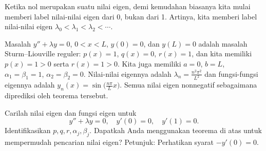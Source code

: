 Ketika nol
merupakan suatu nilai eigen, demi kemudahan biasanya kita
mulai memberi label nilai-nilai eigen dari 0, bukan dari 1.
Artinya, kita memberi label nilai-nilai eigen $\lambda_0 < \lambda_1 < \lambda_2 < \cdots$.

\begin{example}
Masalah $y''+\lambda y=0$, $0 < x < L$, $y(0) = 0$, dan $y(L) = 0$
adalah masalah Sturm--Liouville reguler: $p(x) = 1$, $q(x) = 0$, $r(x) = 1$,
dan kita memiliki $p(x) = 1 > 0$ serta $r(x) = 1 > 0$.  Kita juga memiliki
$a=0$, $b=L$, $\alpha_1 = \beta_1 = 1$, $\alpha_2 = \beta_2 = 0$.
Nilai-nilai eigennya adalah $\lambda_n = \frac{n^2 \pi^2}{L^2}$ dan fungsi-fungsi eigennya
adalah $y_n(x) = \sin\bigl(\frac{n\pi}{L} x\bigr)$.  Semua nilai eigen nonnegatif sebagaimana
diprediksi oleh teorema tersebut.
\end{example}

\begin{exercise}
Carilah nilai eigen dan fungsi eigen untuk
\begin{equation*}
y'' + \lambda y = 0, \quad y'(0) = 0, \quad y'(1) = 0.
\end{equation*}
Identifikasikan
$p, q, r, \alpha_j, \beta_j$.
Dapatkah Anda menggunakan teorema di atas untuk mempermudah pencarian nilai eigen?
Petunjuk: Perhatikan syarat $-y'(0)=0$.
\end{exercise}

